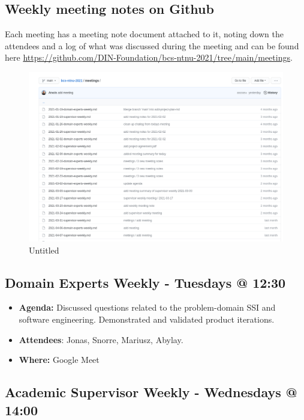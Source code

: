 \hypertarget{weekly-meeting-notes-on-github}{%
\subsection{Weekly meeting notes on
Github}\label{weekly-meeting-notes-on-github}}

Each meeting has a meeting note document attached to it, noting down the
attendees and a log of what was discussed during the meeting and can be
found here
\url{https://github.com/DIN-Foundation/bcs-ntnu-2021/tree/main/meetings}.

\begin{figure}
\centering
\includegraphics{Development Process a132dd5987b94adf8fc5989add9afc3f/Untitled 4.png}
\caption{Untitled}
\end{figure}

\hypertarget{domain-experts-weekly---tuesdays-1230}{%
\subsection{Domain Experts Weekly - Tuesdays @
12:30}\label{domain-experts-weekly---tuesdays-1230}}

\begin{itemize}
\tightlist
\item
  \textbf{Agenda:} Discussed questions related to the problem-domain SSI
  and software engineering. Demonstrated and validated product
  iterations.
\item
  \textbf{Attendees}: Jonas, Snorre, Mariusz, Abylay.
\item
  \textbf{Where:} Google Meet
\end{itemize}

\hypertarget{academic-supervisor-weekly---wednesdays-1400}{%
\subsection{Academic Supervisor Weekly - Wednesdays @
14:00}\label{academic-supervisor-weekly---wednesdays-1400}}

